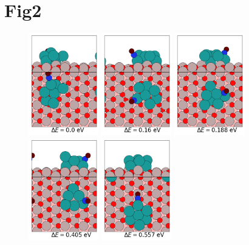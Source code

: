 \documentclass{article}
\begin{document}
\section{Fig2}
\begin{figure}[htp]
\begin{center}
\subfigure
{
  \includegraphics[width=1.2in]{Pt7CO_Al2O3_Lowlying_DFTrelxed_0.png}
}
\subfigure
{
  \includegraphics[width=1.2in]{Pt7CO_Al2O3_Lowlying_DFTrelxed_1.png}
}
\subfigure
{
  \includegraphics[width=1.2in]{Pt7CO_Al2O3_Lowlying_DFTrelxed_2.png}
}
\subfigure
{
  \includegraphics[width=1.2in]{Pt7CO_Al2O3_Lowlying_DFTrelxed_3.png}
}
\subfigure
{
  \includegraphics[width=1.2in]{Pt7CO_Al2O3_Lowlying_DFTrelxed_4.png}
}
\end{center}
\end{figure}
\end{document}
